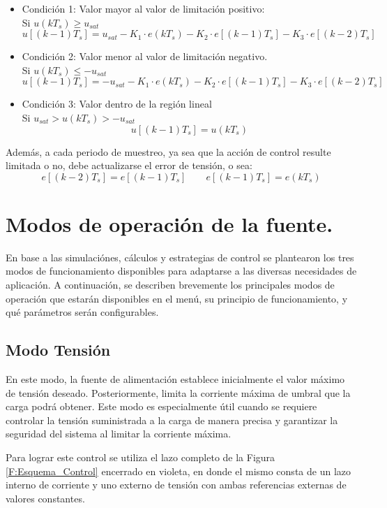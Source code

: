 \begin{itemize}
\item Condición 1: Valor mayor al valor de limitación positivo: \\
Si $u(kT_s)\geq u_{sat}$
\begin{equation}
	u[(k-1)T_s]=u_{sat}-K_{1}\cdot e(kT_s)-K_{2}\cdot e[(k-1)T_s]-K_{3}\cdot e[(k-2)T_s]
\end{equation}

\item Condición 2: Valor menor al valor de limitación negativo. \\
Si $u(kT_s)\leq -u_{sat}$
\begin{equation}
	u[(k-1)T_s]=-u_{sat}-K_{1}\cdot e(kT_s)-K_{2}\cdot e[(k-1)T_s]-K_{3}\cdot e[(k-2)T_s]
\end{equation}
\item Condición 3: Valor dentro de la región lineal \\
Si $u_{sat}>u(kT_s)>-u_{sat}$
\begin{equation}
	u[(k-1)T_s]=u(kT_s)
\end{equation}
\end{itemize} \par 

Además, a cada periodo de muestreo, ya sea que la acción de control resulte limitada o no, debe actualizarse el error de tensión, o sea:
\begin{equation}
	e[(k-2)T_s]=e[(k-1)T_s] \qquad	e[(k-1)T_s]=e(kT_s)
\end{equation}

\section{Modos de operación de la fuente.}
En base a las simulaciónes, cálculos y estrategias de control se plantearon los tres modos de funcionamiento disponibles para adaptarse a las diversas necesidades de aplicación. A continuación, se describen brevemente los principales modos de operación que estarán disponibles en el menú, su principio de funcionamiento, y qué parámetros serán configurables. \par 
\subsection{Modo Tensión}
En este modo, la fuente de alimentación establece inicialmente el valor máximo de tensión deseado. Posteriormente, limita la corriente máxima de umbral que la carga podrá obtener. Este modo es especialmente útil cuando se requiere controlar la tensión suministrada a la carga de manera precisa y garantizar la seguridad del sistema al limitar la corriente máxima.\par
Para lograr este control se utiliza el lazo completo de la Figura \ref{F:Esquema_Control} encerrado en violeta, en donde el mismo consta de un lazo interno de corriente y uno externo de tensión con ambas referencias externas de valores constantes. \par

